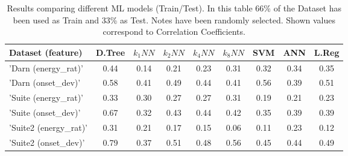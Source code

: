 \begin{table}
\centering
\caption[Results comparing different ML models (Train/Test)]{Results comparing different ML models (Train/Test). In this table 66\% of the Dataset has been used as Train and 33\% as Test. Notes have been randomly selected. Shown values correspond to Correlation Coefficients.}
\label{tab:results_ml_tt}
\footnotesize

\begin{tabular} {lcccccccc}
\\ \hline
Dataset (feature) & D.Tree& $k_1NN$ & $k_2NN$ & $k_4NN$ & $k_8NN$ & SVM & ANN & L.Reg \\ \hline
'Darn (energy\_rat)' & 0.44 & 0.14  & 0.21  & 0.23  & 0.31  & 0.32  & 0.34  & 0.35 \\
'Darn (onset\_dev)' & 0.58 & 0.41  & 0.49  & 0.44  & 0.41  & 0.56  & 0.39  & 0.51 \\
'Suite (energy\_rat)' & 0.33 & 0.30  & 0.27  & 0.27  & 0.31  & 0.19  & 0.21  & 0.23 \\
'Suite (onset\_dev)' & 0.67 & 0.32  & 0.43  & 0.44  & 0.42  & 0.35  & 0.39  & 0.39 \\
'Suite2 (energy\_rat)' & 0.31 & 0.21  & 0.17  & 0.15  & 0.06  & 0.11  & 0.23  & 0.12 \\
'Suite2 (onset\_dev)' & 0.79 & 0.37  & 0.51  & 0.48  & 0.56  & 0.45  & 0.44  & 0.49 \\

\hline
\end{tabular}


\footnotesize

\end{table}
